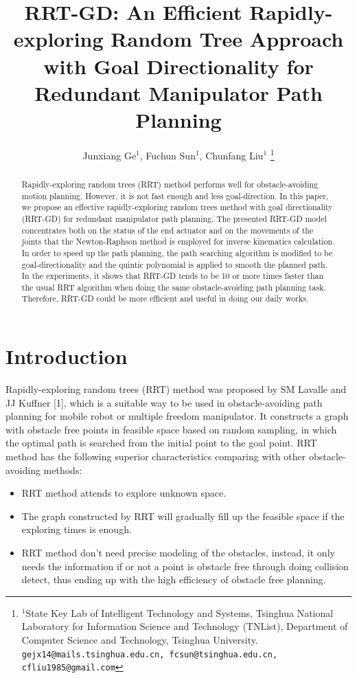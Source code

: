 \documentclass[letterpaper, 10 pt, conference]{ieeeconf}  %
\title{\LARGE \bf
RRT-GD: An Efficient Rapidly-exploring Random Tree Approach with Goal Directionality for Redundant Manipulator Path Planning
}
\author{Junxiang Ge$^{1}$, Fuchun Sun$^{1}$, Chunfang Liu$^{1}$%
\thanks{$^{1}$State Key Lab of Intelligent Technology and Systems, Tsinghua National Laboratory for Information Science and Technology (TNList), Department of Computer Science and Technology, Tsinghua University. {\tt\small gejx14@mails.tsinghua.edu.cn, fcsun@tsinghua.edu.cn, cfliu1985@gmail.com}}%
}
\begin{document}
\maketitle
\thispagestyle{empty}
\pagestyle{empty}


\begin{abstract}
Rapidly-exploring random trees (RRT) method performs well for obstacle-avoiding motion planning. However, it is not fast enough and less goal-direction. In this paper, we propose an effective rapidly-exploring random trees method with goal directionality (RRT-GD)  for redundant manipulator path planning. The presented RRT-GD model concentrates both on the status of the end actuator and on the movements of the joints that the Newton-Raphson method is employed for inverse kinematics calculation. In order to speed up the path planning, the path searching algorithm is modified to be goal-directionality and the quintic polynomial is applied to smooth the planned path. In the experiments, it shows that RRT-GD tends to be 10 or more times faster than the usual RRT algorithm when doing the same obstacle-avoiding path planning task. Therefore, RRT-GD could be more efficient and useful in doing our daily works.
\end{abstract}


\section{Introduction}
 Rapidly-exploring random trees (RRT) method was proposed by SM Lavalle and JJ Kuffner [1], which is a suitable way to be used in obstacle-avoiding path planning for mobile robot or multiple freedom manipulator. It constructs a graph with obstacle free points in feasible space based on random sampling, in which the optimal path is searched from the initial point to the goal point.
 RRT method has the following superior characteristics comparing with other obstacle-avoiding methods:

\begin{itemize}
\item RRT method attends to explore unknown space.
\item The graph constructed by RRT will gradually fill up the feasible space if the exploring times is enough.
\item RRT method don't need precise modeling of the obstacles, instead, it only needs the information if or not a point is obstacle free through doing collision detect, thus ending up with the high efficiency of obstacle free planning.
\end{itemize}
\end{document}
